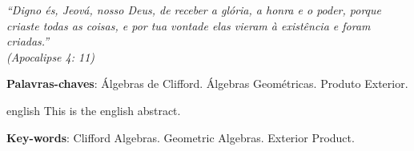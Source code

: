 \documentclass[12pt, oneside, a4paper, english, brazil]{abntex2}
\theoremstyle{normal}
\theoremstyle{observacao}
\begin{document}
\begin{agradecimentos}

\end{agradecimentos}


\begin{epigrafe}
\vspace*{\fill}
\hspace{.24\textwidth}
\begin{minipage}{.7\textwidth}
\flushright
\noindent
\textit{``Digno és, Jeová, nosso Deus, de receber a glória, a honra e o poder, porque criaste todas as coisas, e por tua vontade elas vieram à existência e foram criadas.''\\
(Apocalipse 4: 11)}
\end{minipage}
\end{epigrafe}



\begin{resumo}


\vspace{\onelineskip}

\noindent
\textbf{Palavras-chaves}: Álgebras de Clifford. Álgebras Geométricas. Produto Exterior.
\end{resumo}

\begin{resumo}[Abstract]
\begin{otherlanguage*}{english}
This is the english abstract.

\vspace{\onelineskip}
 
\noindent 
\textbf{Key-words}: Clifford Algebras. Geometric Algebras. Exterior Product.
\end{otherlanguage*}
\end{resumo}

\listoffigures*
\newpage

\listoftables*
\newpage
\end{document}
